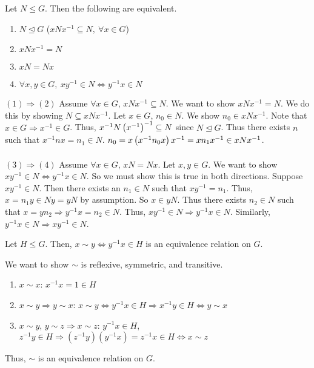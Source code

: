 \documentclass[11pt,letterpaper]{jacky}
\begin{document}
\begin{bthm}
    Let $N\le G$. Then the following are equivalent.
    \begin{enumerate}
        \item $N\unlhd G$ ($xNx^{-1}\subseteq N,\ \forall x\in G$)
        \item $xNx^{-1}=N$
        \item $xN=Nx$
        \item $\forall x,y\in G,\ xy^{-1}\in N\Leftrightarrow y^{-1}x\in N$
    \end{enumerate}
\end{bthm}

\begin{bpf}
    $(1)\Rightarrow(2)$ Assume $\forall x\in G$, $xNx^{-1}\subseteq N$. We want to show $xNx^{-1}=N$. We do this by showing $N\subseteq xNx^{-1}$. Let $x\in G$, $n_0\in N$. We show $n_0\in xNx^{-1}$. Note that $x\in G\Rightarrow x^{-1}\in G$. Thus, $x^{-1}N\left( x^{-1} \right)^{-1}\subseteq N$ since $N\unlhd G$. Thus there exists $n$ such that $x^{-1}nx=n_1\in N$. $n_0=x\left( x^{-1}n_0x \right)x^{-1}=xn_1x^{-1}\in xNx^{-1}$.\\\\
    $(3)\Rightarrow(4)$ Assume $\forall x\in G$, $xN=Nx$. Let $x,y\in G$. We want to show $xy^{-1}\in N\Leftrightarrow y^{-1}x\in N$. So we must show this is true in both directions. Suppose $xy^{-1}\in N$. Then there exists an $n_1\in N$ such that $xy^{-1}=n_1$. Thus, $x=n_1y\in Ny=yN$ by assumption. So $x\in yN$. Thus there exists $n_2\in N$ such that $x=yn_2\Rightarrow y^{-1}x=n_2\in N$. Thus, $xy^{-1}\in N\Rightarrow y^{-1}x\in N$. Similarly, $y^{-1}x\in N\Rightarrow xy^{-1}\in N$.
\end{bpf}

\begin{prop}
    Let $H\le G$. Then, $x\sim y\Leftrightarrow y^{-1}x\in H$ is an equivalence relation on $G$.
\end{prop}

\begin{pf}
    We want to show $\sim$ is reflexive, symmetric, and transitive.
    \begin{enumerate}
        \item $x\sim x$: $x^{-1}x=1\in H$
        \item $x\sim y\Rightarrow y\sim x$: $x\sim y\Leftrightarrow y^{-1}x\in H\Rightarrow x^{-1}y\in H\Leftrightarrow y\sim x$
        \item $x\sim y$, $y\sim z\Rightarrow x\sim z$: $y^{-1}x\in H$, $z^{-1}y\in H\Rightarrow(z^{-1}y)(y^{-1}x)=z^{-1}x\in H\Leftrightarrow x\sim z$
    \end{enumerate}
    Thus, $\sim$ is an equivalence relation on $G$.
\end{pf}
\end{document}
